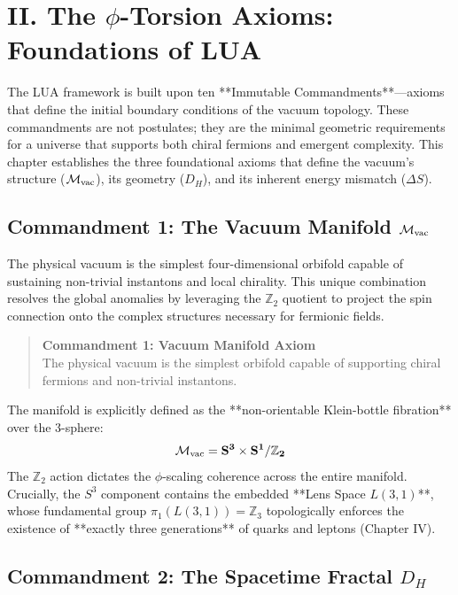 \section{II. The $\phi$-Torsion Axioms: Foundations of LUA}
\label{sec:axioms}

The LUA framework is built upon ten **Immutable Commandments**—axioms that define the initial boundary conditions of the vacuum topology. These commandments are not postulates; they are the minimal geometric requirements for a universe that supports both chiral fermions and emergent complexity. This chapter establishes the three foundational axioms that define the vacuum's structure ($\mathcal{M}_{\rm vac}$), its geometry ($D_H$), and its inherent energy mismatch ($\Delta S$).

\subsection{Commandment 1: The Vacuum Manifold $\mathcal{M}_{\rm vac}$}
\label{sec:commandment1}

The physical vacuum is the simplest four-dimensional orbifold capable of sustaining non-trivial instantons and local chirality. This unique combination resolves the global anomalies by leveraging the $\mathbb{Z}_2$ quotient to project the spin connection onto the complex structures necessary for fermionic fields.

\begin{quote}
\textbf{Commandment 1: Vacuum Manifold Axiom} \\
The physical vacuum is the simplest orbifold capable of supporting chiral fermions and non-trivial instantons.
\end{quote}

The manifold is explicitly defined as the **non-orientable Klein-bottle fibration** over the 3-sphere:
$$
\mathbf{\mathcal{M}_{\rm vac} = S^{3} \times S^{1} / \mathbb{Z}_{2}}
$$
The $\mathbb{Z}_2$ action dictates the $\phi$-scaling coherence across the entire manifold. Crucially, the $S^3$ component contains the embedded **Lens Space $L(3,1)$**, whose fundamental group $\pi_1(L(3,1)) = \mathbb{Z}_3$ topologically enforces the existence of **exactly three generations** of quarks and leptons (Chapter IV).

\subsection{Commandment 2: The Spacetime Fractal $D_H$}
\label{sec:commandment2}

